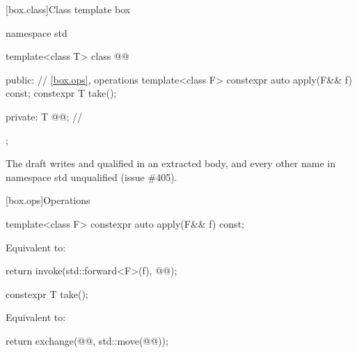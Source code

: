 [box.class]{Class template box}

\begin{codeblock}
namespace std {
  template<class T>
  class @@ {
  public:
    // \ref{box.ops}, operations
    template<class F> constexpr auto apply(F&& f) const;
    constexpr T take();

  private:
    T @@; // \expos
  };
}
\end{codeblock}

\pnum
The draft writes  and  qualified in an extracted body, and every other name in namespace std unqualified (issue \#405).

[box.ops]{Operations}

%
\begin{itemdecl}
template<class F>
  constexpr auto apply(F&& f) const;
\end{itemdecl}

\begin{itemdescr}
\pnum
\effects
Equivalent to:
\begin{codeblock}
return invoke(std::forward<F>(f), @@);
\end{codeblock}
\end{itemdescr}

%
\begin{itemdecl}
constexpr T take();
\end{itemdecl}

\begin{itemdescr}
\pnum
\effects
Equivalent to:
\begin{codeblock}
return exchange(@@, std::move(@@));
\end{codeblock}
\end{itemdescr}
